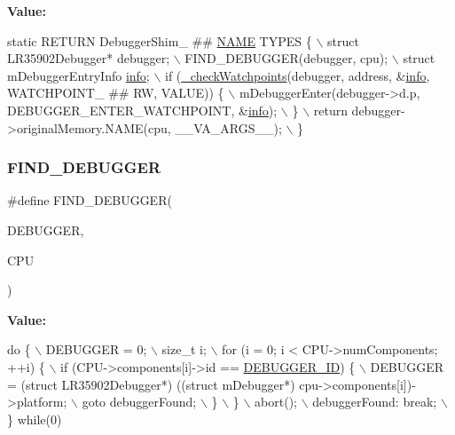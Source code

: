 {\bfseries Value\+:}
\begin{DoxyCode}
\textcolor{keyword}{static} RETURN DebuggerShim\_ ## \mbox{\hyperlink{inflate_8h_a164ea0159d5f0b5f12a646f25f99eceaa67bc2ced260a8e43805d2480a785d312}{NAME}} TYPES \{ \(\backslash\)
        struct LR35902Debugger* debugger; \(\backslash\)
        FIND\_DEBUGGER(debugger, cpu); \(\backslash\)
        struct mDebuggerEntryInfo \mbox{\hyperlink{libretro_8h_a283ad41e4809f9c0ebe736a9861d8a91}{info}}; \(\backslash\)
        if (\mbox{\hyperlink{lr35902_2debugger_2memory-debugger_8c_afbc9d616dc0d5cce0c985e3f53fbbff8}{\_checkWatchpoints}}(debugger, address, &\mbox{\hyperlink{libretro_8h_structretro__game__info}{info}}, WATCHPOINT\_ ## RW, VALUE)) \{ \(\backslash\)
            mDebuggerEnter(debugger->d.p, DEBUGGER\_ENTER\_WATCHPOINT, &\mbox{\hyperlink{libretro_8h_structretro__game__info}{info}}); \(\backslash\)
        \} \(\backslash\)
        return debugger->originalMemory.NAME(cpu, \_\_VA\_ARGS\_\_); \(\backslash\)
    \}
\end{DoxyCode}
\mbox{\label{lr35902_2debugger_2memory-debugger_8c_ac0a015bae6add1406e70a94743727d6d}} 
\subsubsection{\texorpdfstring{F\+I\+N\+D\+\_\+\+D\+E\+B\+U\+G\+G\+ER}{FIND\_DEBUGGER}}
{\footnotesize\ttfamily \#define F\+I\+N\+D\+\_\+\+D\+E\+B\+U\+G\+G\+ER(\begin{DoxyParamCaption}\item[{}]{D\+E\+B\+U\+G\+G\+ER,  }\item[{}]{C\+PU }\end{DoxyParamCaption})}

{\bfseries Value\+:}
\begin{DoxyCode}
\textcolor{keywordflow}{do} \{ \(\backslash\)
        DEBUGGER = 0; \(\backslash\)
        size\_t i; \(\backslash\)
        for (i = 0; i < CPU->numComponents; ++i) \{ \(\backslash\)
            if (CPU->components[i]->id == \mbox{\hyperlink{debugger_2debugger_8c_ae33c11549450a32642dcb0452471a22a}{DEBUGGER\_ID}}) \{ \(\backslash\)
                DEBUGGER = (\textcolor{keyword}{struct }LR35902Debugger*) ((\textcolor{keyword}{struct} mDebugger*) cpu->components[i])->platform; \(\backslash\)
                goto debuggerFound; \(\backslash\)
            \} \(\backslash\)
        \} \(\backslash\)
        abort(); \(\backslash\)
        debuggerFound: \textcolor{keywordflow}{break}; \(\backslash\)
    \} \textcolor{keywordflow}{while}(0)
\end{DoxyCode}


